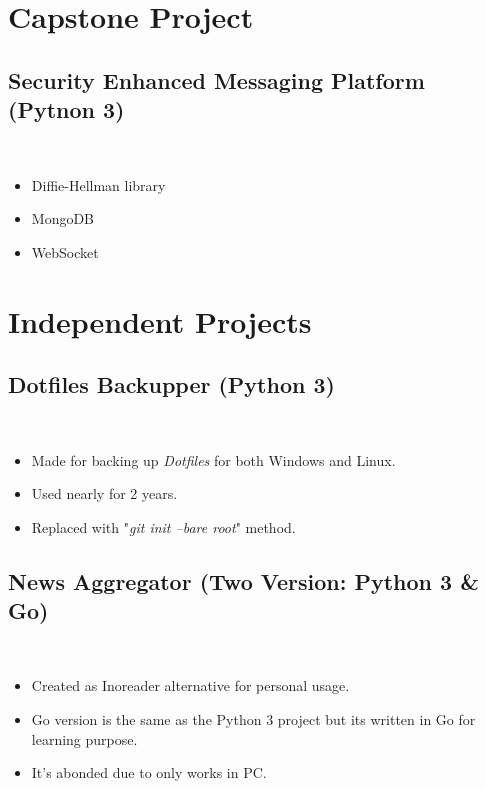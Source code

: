 \documentclass[a4paper, 9pt]{extarticle}
\begin{document}
\maketitle{}
\myeducation{}
\myexperience{}

\section{Capstone Project}
\subsection{Security Enhanced Messaging Platform (Pytnon 3)} \hfill \\
\begin{itemize}
\item Diffie-Hellman library
\item MongoDB
\item WebSocket
\end{itemize}

\section{Independent Projects}
\subsection{Dotfiles Backupper (Python 3)} \hfill \\
\begin{itemize}
\item Made for backing up \emph{Dotfiles} for both Windows and Linux.
\item Used nearly for 2 years.
\item Replaced with "\emph{git init --bare root}" method.
\end{itemize}

\subsection{News Aggregator (Two Version: Python 3 \& Go)} \hfill \\
\begin{itemize}
\item Created as Inoreader alternative for personal usage.
\item Go version is the same as the Python 3 project but its written in Go
	for learning purpose.
\item It's abonded due to only works in PC.
\end{itemize}
\end{document}
